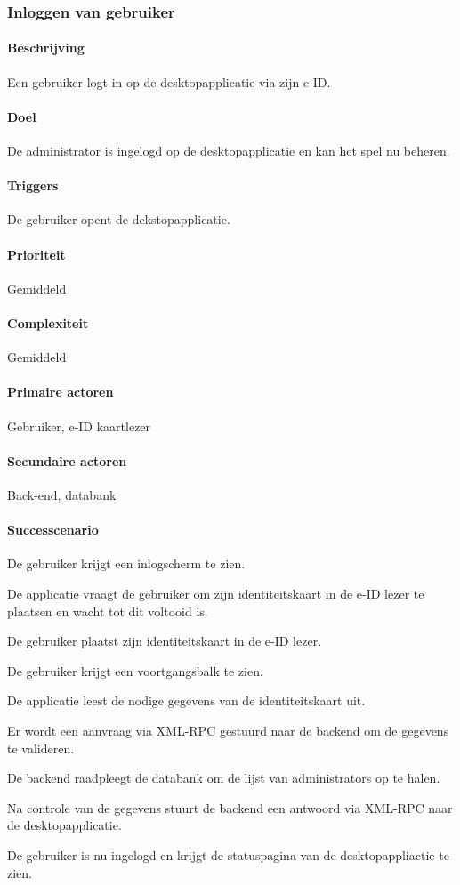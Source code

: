 \subsubsection{Inloggen van gebruiker}
\begin{compact}
\paragraph{Beschrijving} Een gebruiker logt in op de desktopapplicatie via zijn e-ID.
\paragraph{Doel} De administrator is ingelogd op de desktopapplicatie en kan het spel nu beheren.
\paragraph{Triggers}De gebruiker opent de dekstopapplicatie.
\paragraph{Prioriteit}Gemiddeld
\paragraph{Complexiteit}Gemiddeld
\paragraph{Primaire actoren}Gebruiker, e-ID kaartlezer
\paragraph{Secundaire actoren}Back-end, databank
\paragraph{Successcenario}
\begin{enumerate_compact}
 \item De gebruiker krijgt een inlogscherm te zien.
 \item De applicatie vraagt de gebruiker om zijn identiteitskaart in de e-ID lezer te plaatsen en wacht tot dit voltooid is.
 \item De gebruiker plaatst zijn identiteitskaart in de e-ID lezer.
 \item De gebruiker krijgt een voortgangsbalk te zien.
 \item De applicatie leest de nodige gegevens van de identiteitskaart uit.
 \item Er wordt een aanvraag via XML-RPC gestuurd naar de backend om de gegevens te valideren.
 \item De backend raadpleegt de databank om de lijst van administrators op te halen.
 \item Na controle van de gegevens stuurt de backend een antwoord via XML-RPC naar de desktopapplicatie.
 \item De gebruiker is nu ingelogd en krijgt de statuspagina van de desktopappliactie te zien.
\end{enumerate_compact}

\end{compact}
